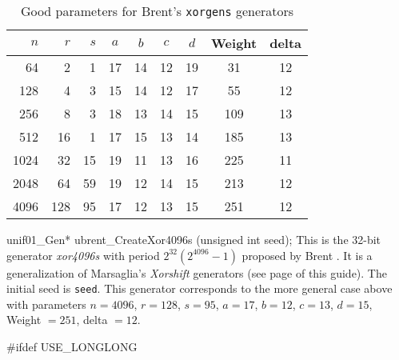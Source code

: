 \begin {table}
\centering
\label {tab:brentparam32}
\caption {Good parameters for Brent's \texttt{xorgens} generators}
\begin {tabular}{@{\extracolsep{15pt}}|rrrcccccc|}
\hline
    $n$ &  $r$  &   $s$ &   $a$ &  $b$ &  $c$ &  $d$ &  Weight & delta \\ 
\hline
 64  &   2  &  1  &  17  &  14  &  12  &  19  &  \phantom{1}31  &  12 \\
 128  &  4  &  3  &  15  &  14  &  12  &  17  &  \phantom{1}55  &  12 \\
 256  &  8  &  3  &  18  &  13  &  14  &  15  &  109  &  13 \\
 512  &  16  &  1  &  17  &  15  &  13  &  14  &  185  &  13 \\
 1024  &  32  &  15  &  19  &  11  &  13  &  16  &  225  &  11 \\
 2048  &  64  &  59  &  19  &  12  &  14  &  15  &  213  &  12 \\
 4096  &  128  &  95  &  17  &  12  &  13  &  15  &  251  &  12 \\
\hline
\end {tabular}
\end {table}
\code

unif01_Gen* ubrent_CreateXor4096s (unsigned int seed);
\endcode
  \tab This is the 32-bit generator  \textit{xor4096s} with period
 $2^{32}(2^{4096}-1)$ proposed by Brent \cite{rBRE04a}.
 It is a generalization of
 Marsaglia's \textit{Xorshift} generators \cite{rMAR03a} (see page
 \pageref{marsa-xorshift} of this guide).
  The initial seed is \texttt{seed}. This generator corresponds to the more
general case above with parameters
$n=4096$,  $r=128$,   $s=95$,  $a=17$,  $b=12$,  $c=13$, $d=15$,
 Weight $=251$,  delta $=12$.
%
  \endtab
\code


#ifdef USE_LONGLONG

